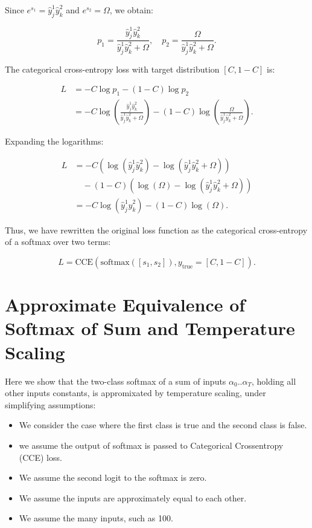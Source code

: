 \documentclass[twoside,11pt]{article}
\begin{document}
Since $e^{s_1} = \hat{y}_j^1 \hat{y}_k^2$ and $e^{s_2} = \Omega$, we obtain:

\[
p_1 = \frac{\hat{y}_j^1 \hat{y}_k^2}{\hat{y}_j^1 \hat{y}_k^2 + \Omega}, \quad
p_2 = \frac{\Omega}{\hat{y}_j^1 \hat{y}_k^2 + \Omega}.
\]

The categorical cross-entropy loss with target distribution $[C, 1 - C]$ is:

\begin{align}
  \nonumber
  L &= - C \log p_1 - (1 - C) \log p_2 \\
  \nonumber
  &= - C \log \left( \frac{\hat{y}_j^1 \hat{y}_k^2}{\hat{y}_j^1 \hat{y}_k^2 + \Omega} \right) 
        - (1 - C) \log \left( \frac{\Omega}{\hat{y}_j^1 \hat{y}_k^2 + \Omega} \right).
\end{align}

Expanding the logarithms:

\begin{align}
  \nonumber
  L &= - C \left( \log (\hat{y}_j^1 \hat{y}_k^2) - \log (\hat{y}_j^1 \hat{y}_k^2 + \Omega) \right) \\
    \nonumber
    &\quad - (1 - C) \left( \log (\Omega) - \log (\hat{y}_j^1 \hat{y}_k^2 + \Omega) \right) \\
    \nonumber
    &= - C \log (\hat{y}_j^1 \hat{y}_k^2) - (1 - C) \log (\Omega) .
  \end{align}


Thus, we have rewritten the original loss function as the categorical cross-entropy of a softmax over two terms:

\[
L = \text{CCE}(\text{softmax}([s_1, s_2]), y_{\text{true}}=[C, 1 - C]).
\]


\section{Approximate Equivalence of Softmax of Sum and Temperature Scaling}

\label{app:softmax-sum-temp}

Here we show that the two-class softmax of a sum of inputs $\alpha_0..\alpha_T$, 
holding 
all other inputs constants, is appromixated by 
temperature scaling, under simplifying assumptions:

\begin{itemize}
  \item We consider the case where the first class is true and the second class is false. 
  \item we assume the output of softmax is passed to Categorical Crossentropy (CCE) loss. 
  \item We assume the second logit to the softmax is zero.
  \item We assume the inputs are approximately equal to each other. 
  \item We assume the many inputs, such as 100. 
\end{itemize}
\end{document}
